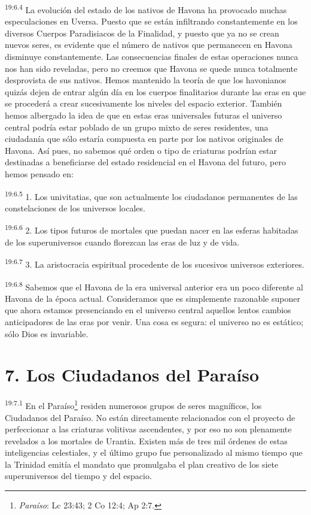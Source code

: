 \par
\textsuperscript{19:6.4} La evolución del estado de los nativos de Havona ha provocado muchas especulaciones en Uversa. Puesto que se están infiltrando constantemente en los diversos Cuerpos Paradisiacos de la Finalidad, y puesto que ya no se crean nuevos seres, es evidente que el número de nativos que permanecen en Havona disminuye constantemente. Las consecuencias finales de estas operaciones nunca nos han sido reveladas, pero no creemos que Havona se quede nunca totalmente desprovista de sus nativos. Hemos mantenido la teoría de que los havonianos quizás dejen de entrar algún día en los cuerpos finalitarios durante las eras en que se procederá a crear sucesivamente los niveles del espacio exterior. También hemos albergado la idea de que en estas eras universales futuras el universo central podría estar poblado de un grupo mixto de seres residentes, una ciudadanía que sólo estaría compuesta en parte por los nativos originales de Havona. Así pues, no sabemos qué orden o tipo de criaturas podrían estar destinadas a beneficiarse del estado residencial en el Havona del futuro, pero hemos pensado en:

\par
\textsuperscript{19:6.5} 1. Los univitatias, que son actualmente los ciudadanos permanentes de las constelaciones de los universos locales.

\par
\textsuperscript{19:6.6} 2. Los tipos futuros de mortales que puedan nacer en las esferas habitadas de los superuniversos cuando florezcan las eras de luz y de vida.

\par
\textsuperscript{19:6.7} 3. La aristocracia espiritual procedente de los sucesivos universos exteriores.

\par
\textsuperscript{19:6.8} Sabemos que el Havona de la era universal anterior era un poco diferente al Havona de la época actual. Consideramos que es simplemente razonable suponer que ahora estamos presenciando en el universo central aquellos lentos cambios anticipadores de las eras por venir. Una cosa es segura: el universo no es estático; sólo Dios es invariable.

\section*{7. Los Ciudadanos del Paraíso}
\par
\textsuperscript{19:7.1} En el Paraíso\footnote{\textit{Paraíso}: Lc 23:43; 2 Co 12:4; Ap 2:7.} residen numerosos grupos de seres magníficos, los Ciudadanos del Paraíso. No están directamente relacionados con el proyecto de perfeccionar a las criaturas volitivas ascendentes, y por eso no son plenamente revelados a los mortales de Urantia. Existen más de tres mil órdenes de estas inteligencias celestiales, y el último grupo fue personalizado al mismo tiempo que la Trinidad emitía el mandato que promulgaba el plan creativo de los siete superuniversos del tiempo y del espacio.

